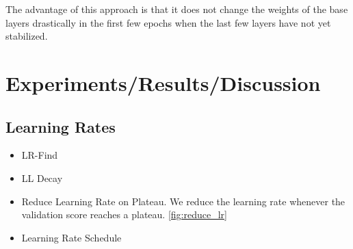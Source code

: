 \documentclass{article}
\begin{document}
The advantage of this approach is that it does not change the weights of the base layers drastically in the first few epochs when the last few layers have not yet stabilized. 

\section{Experiments/Results/Discussion}

\subsection{Learning Rates}

\begin{itemize}
    \item LR-Find
    \item LL Decay
    \item Reduce Learning Rate on Plateau. We reduce the learning rate whenever the validation score reaches a plateau. \ref{fig:reduce_lr}
    \item Learning Rate Schedule
\end{itemize}
\end{document}
